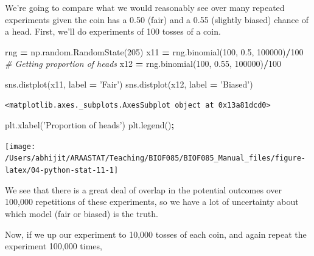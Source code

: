 \documentclass[
  letterpaper,
]{scrbook}
\newenvironment{Shaded}{\begin{snugshade}}{\end{snugshade}}
\newcommand{\CommentTok}[1]{\textcolor[rgb]{0.56,0.35,0.01}{\textit{#1}}}
\newcommand{\DecValTok}[1]{\textcolor[rgb]{0.00,0.00,0.81}{#1}}
\newcommand{\FloatTok}[1]{\textcolor[rgb]{0.00,0.00,0.81}{#1}}
\newcommand{\NormalTok}[1]{#1}
\newcommand{\OperatorTok}[1]{\textcolor[rgb]{0.81,0.36,0.00}{\textbf{#1}}}
\newcommand{\StringTok}[1]{\textcolor[rgb]{0.31,0.60,0.02}{#1}}
\begin{document}
We're going to compare what we would reasonably see over many repeated experiments given the coin has a 0.50 (fair) and a 0.55 (slightly biased) chance of a head. First, we'll do experiments of 100 tosses of a coin.

\begin{Shaded}
\begin{Highlighting}[]
\NormalTok{rng }\OperatorTok{=}\NormalTok{ np.random.RandomState(}\DecValTok{205}\NormalTok{)}
\NormalTok{x11 }\OperatorTok{=}\NormalTok{ rng.binomial(}\DecValTok{100}\NormalTok{, }\FloatTok{0.5}\NormalTok{, }\DecValTok{100000}\NormalTok{)}\OperatorTok{/}\DecValTok{100} \CommentTok{# Getting proportion of heads}
\NormalTok{x12 }\OperatorTok{=}\NormalTok{ rng.binomial(}\DecValTok{100}\NormalTok{, }\FloatTok{0.55}\NormalTok{, }\DecValTok{100000}\NormalTok{)}\OperatorTok{/}\DecValTok{100} 

\NormalTok{sns.distplot(x11, label }\OperatorTok{=} \StringTok{'Fair'}\NormalTok{)}
\NormalTok{sns.distplot(x12, label }\OperatorTok{=} \StringTok{'Biased'}\NormalTok{)}
\end{Highlighting}
\end{Shaded}

\begin{verbatim}
<matplotlib.axes._subplots.AxesSubplot object at 0x13a81dcd0>
\end{verbatim}

\begin{Shaded}
\begin{Highlighting}[]
\NormalTok{plt.xlabel(}\StringTok{'Proportion of heads'}\NormalTok{)}
\NormalTok{plt.legend()}\OperatorTok{;}
\end{Highlighting}
\end{Shaded}

\begin{center}\texttt{[image: /Users/abhijit/ARAASTAT/Teaching/BIOF085/BIOF085\_Manual\_files/figure-latex/04-python-stat-11-1]} \end{center}

We see that there is a great deal of overlap in the potential outcomes over 100,000 repetitions of these experiments, so we have a lot of uncertainty about which model (fair or biased) is the truth.

Now, if we up our experiment to 10,000 tosses of each coin, and again repeat the experiment 100,000 times,
\end{document}
